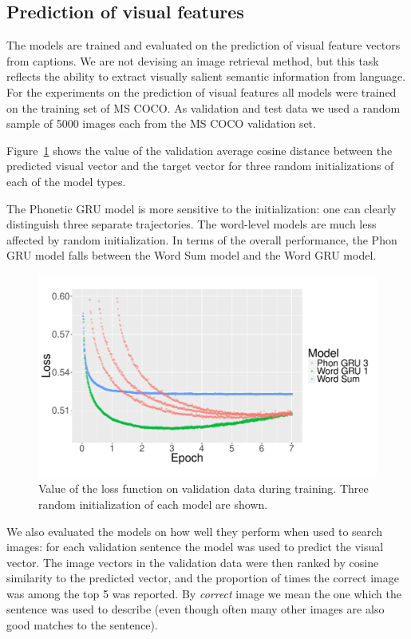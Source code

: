 \subsection{Prediction of visual features}
\label{subsec:visual}
The models are trained and evaluated on the prediction of visual feature vectors from captions. We are not devising an image retrieval method, but this task reflects the ability to extract visually salient semantic information from language.
For the experiments on the prediction of visual features all models
were trained on the training set of MS COCO. As validation and test data we
used a random sample of 5000 images each from the MS COCO validation set. 

Figure~\ref{fig:loss} shows the value of the validation average cosine distance
between the predicted visual vector and the target vector for three
random initializations of each of the model types. 

The Phonetic GRU model is more sensitive to the initialization: one
can clearly distinguish three separate trajectories. The word-level models
are much less affected by random initialization. In terms of the
overall performance, the {\sc Phon GRU} model falls between the
{\sc Word Sum} model and the {\sc Word GRU} model.

\begin{figure}
  \centering
  \includegraphics[scale=0.3]{loss-zoom.pdf}
  \caption{Value of the loss function on validation data during
    training. Three random initialization of each model are shown.}
  \label{fig:loss}
\end{figure}

We also evaluated the models on how well they perform when used to
search images: for each validation sentence the model was used to predict the
visual vector. The image vectors in the validation data were then
ranked by cosine similarity to the predicted vector, and the
proportion of times the correct image was among the top 5 was
reported. By {\it correct} image we mean the one which the sentence
was used to describe (even though often many other images are also
good matches to the sentence). 

